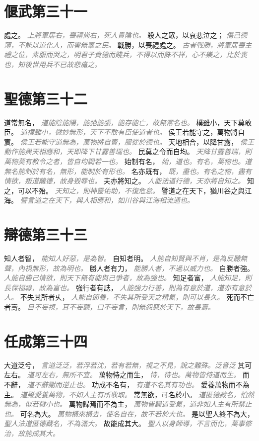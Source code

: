 \documentclass[a4paper,zihao=-4,oneside,landscape,UTF8]{ctexart}
\newcommand{\zhushi}[1]{\scriptsize{\textit{\textcolor{gray}{#1}}}\normalsize}
\begin{document}
\section{偃武第三十一}

處之。
\zhushi{上將軍居右，喪禮尚右，死人貴陰也。}
殺人之眾，以哀悲泣之；
\zhushi{傷己德薄，不能以道化人，而害無辜之民。}
戰勝，以喪禮處之。
\zhushi{古者戰勝，將軍居喪主禮之位，素服而哭之，明君子貴德而賤兵，不得以而誅不祥，心不樂之，比於喪也，知後世用兵不已故悲痛之。}


\section{聖德第三十二}

道常無名，
\zhushi{道能陰能陽，能弛能張，能存能亡，故無常名也。}
樸雖小，天下莫敢臣。
\zhushi{道樸雖小，微妙無形，天下不敢有臣使道者也。}
侯王若能守之，萬物將自賔。
\zhushi{侯王若能守道無為，萬物將自賓，服從於德也。}
天地相合，以降甘露，
\zhushi{侯王動作能與天相應和，天即降下甘露善瑞也。}
民莫之令而自均。
\zhushi{天降甘露善瑞，則萬物莫有教令之者，皆自均調若一也。}
始制有名，
\zhushi{始，道也。有名，萬物也。道無名能制於有名，無形，能制於有形也。}
名亦既有，
\zhushi{既，盡也。有名之物，盡有情欲，叛道離德，故身毀辱也。}
夫亦將知之。
\zhushi{人能法道行德，天亦將自知之。}
知之，可以不殆。
\zhushi{天知之，則神靈佑助，不復危怠。}
譬道之在天下，猶川谷之與江海。
\zhushi{譬言道之在天下，與人相應和，如川谷與江海相流通也。}


\section{辯德第三十三}

知人者智，
\zhushi{能知人好惡，是為智。}
自知者明。
\zhushi{人能自知賢與不肖，是為反聽無聲，內視無形，故為明也。}
勝人者有力，
\zhushi{能勝人者，不過以威力也。}
自勝者強。
\zhushi{人能自勝己情欲，則天下無有能與己爭者，故為強也。}
知足者富，
\zhushi{人能知足，則長保福祿，故為富也。}
強行者有誌，
\zhushi{人能強力行善，則為有意於道，道亦有意於人。}
不失其所者乆，
\zhushi{人能自節養，不失其所受天之精氣，則可以長久。}
死而不亡者壽。
\zhushi{目不妄視，耳不妄聽，口不妄言，則無怨惡於天下，故長壽。}


\section{任成第三十四}

大道泛兮，
\zhushi{言道泛泛，若浮若沈，若有若無，視之不見，說之難殊。泛音泛}
其可左右。
\zhushi{道可左右，無所不宜。}
萬物恃之而生，
\zhushi{恃，待也。萬物皆恃道而生。}
而不辭，
\zhushi{道不辭謝而逆止也。}
功成不名有，
\zhushi{有道不名其有功也。}
愛養萬物而不為主。
\zhushi{道雖愛養萬物，不如人主有所收取。}
常無欲，可名於小。
\zhushi{道匿德藏名，怕然無為，似若微小也。}
萬物歸焉而不為主，
\zhushi{萬物皆歸道受氣，道非如人主有所禁止也。}
可名為大。
\zhushi{萬物橫來橫去，使名自在，故不若於大也。}
是以聖人終不為大，
\zhushi{聖人法道匿德藏名，不為滿大。}
故能成其大。
\zhushi{聖人以身師導，不言而化，萬事修治，故能成其大。}
\end{document}
